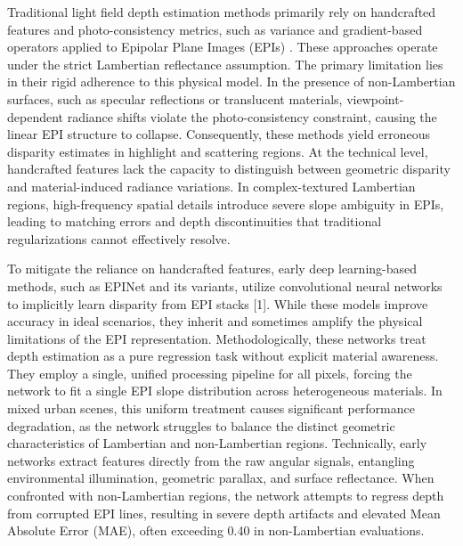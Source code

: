 Traditional light field depth estimation methods primarily rely on handcrafted features and photo-consistency metrics, such as variance and gradient-based operators applied to Epipolar Plane Images (EPIs) . These approaches operate under the strict Lambertian reflectance assumption. The primary limitation lies in their rigid adherence to this physical model. In the presence of non-Lambertian surfaces, such as specular reflections or translucent materials, viewpoint-dependent radiance shifts violate the photo-consistency constraint, causing the linear EPI structure to collapse. Consequently, these methods yield erroneous disparity estimates in highlight and scattering regions. At the technical level, handcrafted features lack the capacity to distinguish between geometric disparity and material-induced radiance variations. In complex-textured Lambertian regions, high-frequency spatial details introduce severe slope ambiguity in EPIs, leading to matching errors and depth discontinuities that traditional regularizations cannot effectively resolve.

To mitigate the reliance on handcrafted features, early deep learning-based methods, such as EPINet and its variants, utilize convolutional neural networks to implicitly learn disparity from EPI stacks [1]. While these models improve accuracy in ideal scenarios, they inherit and sometimes amplify the physical limitations of the EPI representation. Methodologically, these networks treat depth estimation as a pure regression task without explicit material awareness. They employ a single, unified processing pipeline for all pixels, forcing the network to fit a single EPI slope distribution across heterogeneous materials. In mixed urban scenes, this uniform treatment causes significant performance degradation, as the network struggles to balance the distinct geometric characteristics of Lambertian and non-Lambertian regions. Technically, early networks extract features directly from the raw angular signals, entangling environmental illumination, geometric parallax, and surface reflectance. When confronted with non-Lambertian regions, the network attempts to regress depth from corrupted EPI lines, resulting in severe depth artifacts and elevated Mean Absolute Error (MAE), often exceeding 0.40 in non-Lambertian evaluations.

